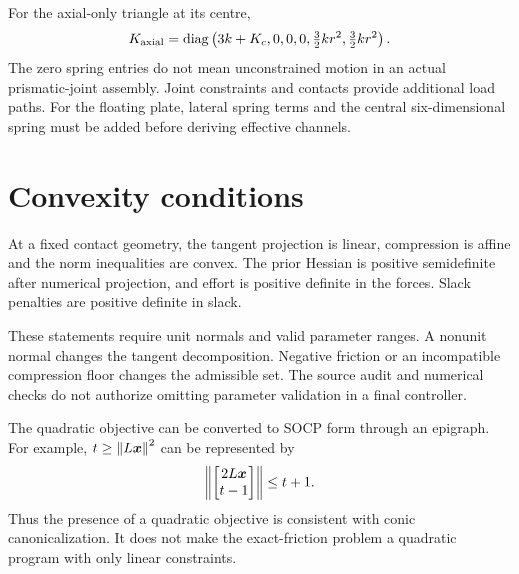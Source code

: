 For the axial-only triangle at its centre,
\begin{equation}
K_{\mathrm{axial}}=\operatorname{diag}\left(3k+K_c,0,0,0,\tfrac32kr^2,\tfrac32kr^2\right).
\end{equation}
The zero spring entries do not mean unconstrained motion in an actual prismatic-joint assembly. Joint constraints and contacts provide additional load paths. For the floating plate, lateral spring terms and the central six-dimensional spring must be added before deriving effective channels.

\section{Convexity conditions}

At a fixed contact geometry, the tangent projection is linear, compression is affine and the norm inequalities are convex. The prior Hessian is positive semidefinite after numerical projection, and effort is positive definite in the forces. Slack penalties are positive definite in slack.

These statements require unit normals and valid parameter ranges. A nonunit normal changes the tangent decomposition. Negative friction or an incompatible compression floor changes the admissible set. The source audit and numerical checks do not authorize omitting parameter validation in a final controller.

The quadratic objective can be converted to SOCP form through an epigraph. For example, $t\geq\left\lVert L\bm{x}\right\rVert^2$ can be represented by
\begin{equation}
\left\lVert\begin{bmatrix}2L\bm{x}\\t-1\end{bmatrix}\right\rVert\leq t+1.
\end{equation}
Thus the presence of a quadratic objective is consistent with conic canonicalization. It does not make the exact-friction problem a quadratic program with only linear constraints.

